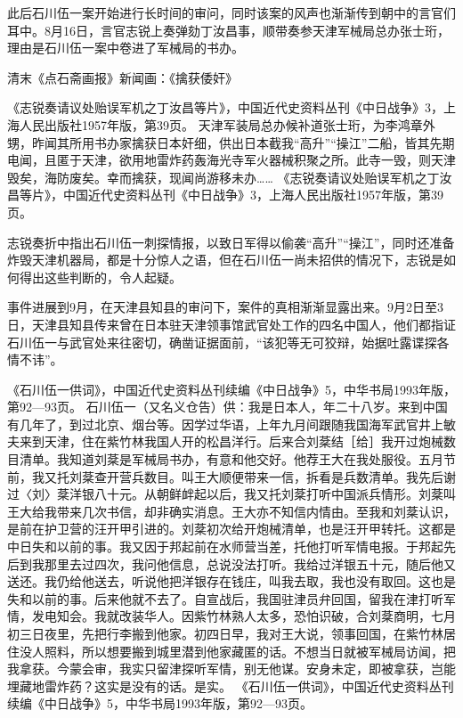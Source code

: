 \documentclass[12pt,UTF8]{ctexbook}
\begin{document}
此后石川伍一案开始进行长时间的审问，同时该案的风声也渐渐传到朝中的言官们耳中。8月16日，言官志锐上奏弹劾丁汝昌事，顺带奏参天津军械局总办张士珩，理由是石川伍一案中卷进了军械局的书办。


清末《点石斋画报》新闻画：《擒获倭奸》

《志锐奏请议处贻误军机之丁汝昌等片》，中国近代史资料丛刊《中日战争》3，上海人民出版社1957年版，第39页。
天津军装局总办候补道张士珩，为李鸿章外甥，昨闻其所用书办家擒获日本奸细，供出日本截我“高升”“操江”二船，皆其先期电闻，且匿于天津，欲用地雷炸药轰海光寺军火器械积聚之所。此寺一毁，则天津毁矣，海防废矣。幸而擒获，现闻尚游移未办…… 《志锐奏请议处贻误军机之丁汝昌等片》，中国近代史资料丛刊《中日战争》3，上海人民出版社1957年版，第39页。

志锐奏折中指出石川伍一刺探情报，以致日军得以偷袭“高升”“操江”，同时还准备炸毁天津机器局，都是十分惊人之语，但在石川伍一尚未招供的情况下，志锐是如何得出这些判断的，令人起疑。

事件进展到9月，在天津县知县的审问下，案件的真相渐渐显露出来。9月2日至3日，天津县知县传来曾在日本驻天津领事馆武官处工作的四名中国人，他们都指证石川伍一与武官处来往密切，确凿证据面前，“该犯等无可狡辩，始据吐露谍探各情不讳”。

《石川伍一供词》，中国近代史资料丛刊续编《中日战争》5，中华书局1993年版，第92—93页。
石川伍一（又名义仓告）供：我是日本人，年二十八岁。来到中国有几年了，到过北京、烟台等。因学过华语，上年九月间跟随我国海军武官井上敏夫来到天津，住在紫竹林我国人开的松昌洋行。后来合刘棻结［给］我开过炮械数目清单。我知道刘棻是军械局书办，有意和他交好。他荐王大在我处服役。五月节前，我又托刘棻查开营兵数目。叫王大顺便带来一信，拆看是兵数清单。我先后谢过〈刘〉棻洋银八十元。从朝鲜衅起以后，我又托刘棻打听中国派兵情形。刘棻叫王大给我带来几次书信，却非确实消息。王大亦不知信内情由。至我和刘棻认识，是前在护卫营的汪开甲引进的。刘棻初次给开炮械清单，也是汪开甲转托。这都是中日失和以前的事。我又因于邦起前在水师营当差，托他打听军情电报。于邦起先后到我那里去过四次，我问他信息，总说没法打听。我给过洋银五十元，随后他又送还。我仍给他送去，听说他把洋银存在钱庄，叫我去取，我也没有取回。这也是失和以前的事。后来他就不去了。自宣战后，我国驻津员弁回国，留我在津打听军情，发电知会。我就改装华人。因紫竹林熟人太多，恐怕识破，合刘棻商明，七月初三日夜里，先把行李搬到他家。初四日早，我对王大说，领事回国，在紫竹林居住没人照料，所以想要搬到城里潜到他家藏匿的话。不想当日就被军械局访闻，把我拿获。今蒙会审，我实只留津探听军情，别无他谋。安身未定，即被拿获，岂能埋藏地雷炸药？这实是没有的话。是实。 《石川伍一供词》，中国近代史资料丛刊续编《中日战争》5，中华书局1993年版，第92—93页。
\end{document}
